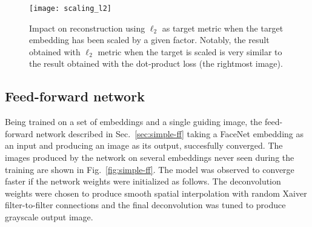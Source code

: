 \documentclass{article}
\newcommand{\Fig}[1]{Fig.~\ref{#1}}
\newcommand{\Sec}[1]{Sec.~\ref{#1}}
\begin{document}
  \begin{figure}
      \centering
      \texttt{[image: scaling\_l2]}
      \caption{Impact on reconstruction using $\ell_2$ as target metric when the target embedding has been scaled by a given factor.
      Notably, the result obtained with $\ell_2$ metric when the target is scaled is very similar to the result obtained with the dot-product loss (the rightmost image).}
      \label{fig:scaling}
  \end{figure}

  \subsection{Feed-forward network}

  Being trained on a set of embeddings and a single guiding image, the feed-forward network described in \Sec{sec:simple-ff} taking a FaceNet embedding as an input and producing an image as its output, succesfully converged.
  The images produced by the network on several embeddings never seen during the training are shown in \Fig{fig:simple-ff}.
  The model was observed to converge faster if the network weights were initialized as follows.
  The deconvolution weights were chosen to produce smooth spatial interpolation with random Xaiver filter-to-filter connections and the final deconvolution was tuned to produce grayscale output image.
\end{document}
